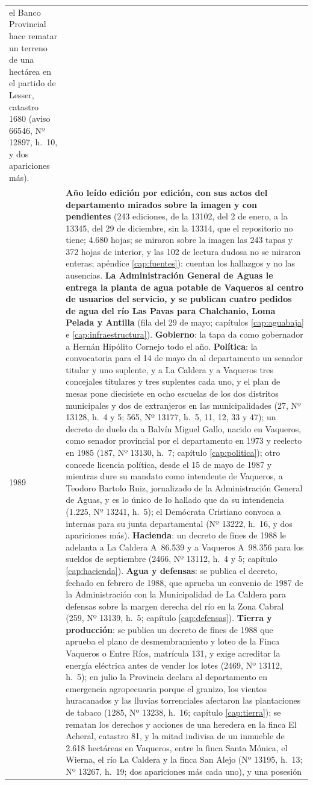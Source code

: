 \begin{longtable}{@{}p{2.7cm}p{10.3cm}@{}}
el Banco Provincial hace rematar un terreno de una hectárea en el partido de Lesser, catastro 1680 (aviso 66546, Nº 12897, h.\ 10, y dos apariciones más). \\
1989 & \textbf{Año leído edición por edición, con sus actos del departamento mirados sobre la imagen y con pendientes} (243 ediciones, de la 13102, del 2 de enero, a la 13345, del 29 de diciembre, sin la 13314, que el repositorio no tiene; 4.680 hojas; se miraron sobre la imagen las 243 tapas y 372 hojas de interior, y las 102 de lectura dudosa no se miraron enteras; apéndice \ref{cap:fuentes}): cuentan los hallazgos y no las ausencias. \textbf{La Administración General de Aguas le entrega la planta de agua potable de Vaqueros al centro de usuarios del servicio, y se publican cuatro pedidos de agua del río Las Pavas para Chalchanio, Loma Pelada y Antilla} (fila del 29 de mayo; capítulos \ref{cap:aguabaja} e \ref{cap:infraestructura}). \textbf{Gobierno}: la tapa da como gobernador a Hernán Hipólito Cornejo todo el año. \textbf{Política}: la convocatoria para el 14 de mayo da al departamento un senador titular y uno suplente, y a La Caldera y a Vaqueros tres concejales titulares y tres suplentes cada uno, y el plan de mesas pone diecisiete en ocho escuelas de los dos distritos municipales y dos de extranjeros en las municipalidades (27, Nº 13128, h.\ 4 y 5; 565, Nº 13177, h.\ 5, 11, 12, 33 y 47); un decreto de duelo da a Balvín Miguel Gallo, nacido en Vaqueros, como senador provincial por el departamento en 1973 y reelecto en 1985 (187, Nº 13130, h.\ 7; capítulo \ref{cap:politica}); otro concede licencia política, desde el 15 de mayo de 1987 y mientras dure su mandato como intendente de Vaqueros, a Teodoro Bartolo Ruiz, jornalizado de la Administración General de Aguas, y es lo único de lo hallado que da su intendencia (1.225, Nº 13241, h.\ 5); el Demócrata Cristiano convoca a internas para su junta departamental (Nº 13222, h.\ 16, y dos apariciones más). \textbf{Hacienda}: un decreto de fines de 1988 le adelanta a La Caldera A~86.539 y a Vaqueros A~98.356 para los sueldos de septiembre (2466, Nº 13112, h.\ 4 y 5; capítulo \ref{cap:hacienda}). \textbf{Agua y defensas}: se publica el decreto, fechado en febrero de 1988, que aprueba un convenio de 1987 de la Administración con la Municipalidad de La Caldera para defensas sobre la margen derecha del río en la Zona Cabral (259, Nº 13139, h.\ 5; capítulo \ref{cap:defensas}). \textbf{Tierra y producción}: se publica un decreto de fines de 1988 que aprueba el plano de desmembramiento y loteo de la Finca Vaqueros o Entre Ríos, matrícula 131, y exige acreditar la energía eléctrica antes de vender los lotes (2469, Nº 13112, h.\ 5); en julio la Provincia declara al departamento en emergencia agropecuaria porque el granizo, los vientos huracanados y las lluvias torrenciales afectaron las plantaciones de tabaco (1285, Nº 13238, h.\ 16; capítulo \ref{cap:tierra}); se rematan los derechos y acciones de una heredera en la finca El Acheral, catastro 81, y la mitad indivisa de un inmueble de 2.618 hectáreas en Vaqueros, entre la finca Santa Mónica, el Wierna, el río La Caldera y la finca San Alejo (Nº 13195, h.\ 13; Nº 13267, h.\ 19; dos apariciones más cada uno), y una posesión 
\end{longtable}
